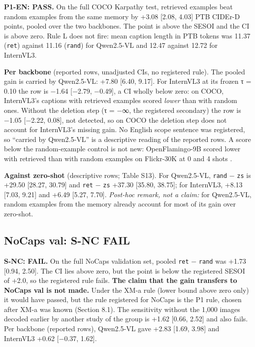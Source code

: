 \documentclass[manuscript,screen]{acmart}
\begin{document}
\textbf{P1-EN: PASS.} On the full COCO Karpathy test, retrieved examples beat random examples from
the same memory by +3.08 {[}2.08, 4.03{]} PTB CIDEr-D points, pooled over the two backbones. The
point is above the SESOI and the CI is above zero. Rule L does not fire: mean caption length in PTB
tokens was 11.37 (\texttt{ret}) against 11.16 (\texttt{rand}) for Qwen2.5-VL and 12.47 against 12.72
for InternVL3.

\textbf{Per backbone} (reported rows, unadjusted CIs, no registered rule). The pooled gain is
carried by Qwen2.5-VL: +7.80 {[}6.40, 9.17{]}. For InternVL3 at its frozen τ = 0.10 the row is −1.64
{[}−2.79, −0.49{]}, a CI wholly below zero: on COCO, InternVL3's captions with retrieved examples
scored \emph{lower} than with random ones. Without the deletion step (τ = −∞, the registered
secondary) the row is −1.05 {[}−2.22, 0.08{]}, not detected, so on COCO the deletion step does not
account for InternVL3's missing gain. No English scope sentence was registered, so ``carried by
Qwen2.5-VL'' is a descriptive reading of the reported rows. A score below the random-example control
is not new: OpenFlamingo-9B scored lower with retrieved than with random examples on Flickr-30K at 0
and 4 shots \citep{Awadalla2023OpenFlamingo}.

\textbf{Against zero-shot} (descriptive rows; Table S13). For Qwen2.5-VL, \texttt{rand} −
\texttt{zs} is +29.50 {[}28.27, 30.79{]} and \texttt{ret} − \texttt{zs} +37.30 {[}35.80, 38.75{]};
for InternVL3, +8.13 {[}7.03, 9.21{]} and +6.49 {[}5.27, 7.70{]}. \emph{Post-hoc remark, not a
claim:} for Qwen2.5-VL, random examples from the memory already account for most of its gain over
zero-shot.

\subsection{NoCaps val: S-NC FAIL}\label{nocaps-val-s-nc-fail}

\textbf{S-NC: FAIL.} On the full NoCaps validation set, pooled \texttt{ret} − \texttt{rand} was
+1.73 {[}0.94, 2.50{]}. The CI lies above zero, but the point is below the registered SESOI of +2.0,
so the registered rule fails. \textbf{The claim that the gain transfers to NoCaps val is not made.}
Under the XM-a rule (lower bound above zero only) it would have passed, but the rule registered for
NoCaps is the P1 rule, chosen after XM-a was known (Section 8.1). The sensitivity without the 1,000
images decoded earlier by another study of the group is +1.62 {[}0.66, 2.52{]} and also fails. Per
backbone (reported rows), Qwen2.5-VL gave +2.83 {[}1.69, 3.98{]} and InternVL3 +0.62 {[}−0.37,
1.62{]}.
\end{document}
